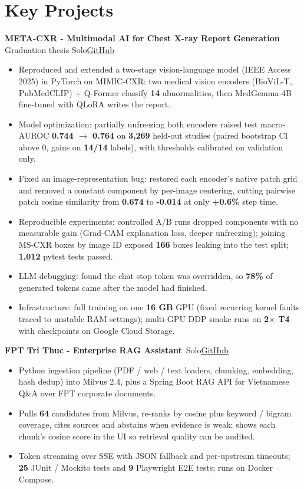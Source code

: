 \documentclass[10pt, a4paper]{article}
\newcommand{\project}[3]{\textbf{#1}\,{\color{MutedText}\textbar{} #2}\hfill\href{#3}{GitHub}\par}
\begin{document}
\section{Key Projects}
\project{META-CXR - Multimodal AI for Chest X-ray Report Generation}{Graduation thesis \textbullet{} Solo}{https://github.com/minhphuong150505/Meta-CXR}
\begin{itemize}
  \item Reproduced and extended a two-stage vision-language model (IEEE Access 2025) in PyTorch on MIMIC-CXR: two medical vision encoders (BioViL-T, PubMedCLIP) + Q-Former classify \textbf{14} abnormalities, then MedGemma-4B fine-tuned with QLoRA writes the report.
  \item Model optimization: partially unfreezing both encoders raised test macro-AUROC \textbf{0.744 $\rightarrow$ 0.764} on \textbf{3,269} held-out studies (paired bootstrap CI above 0, gains on \textbf{14/14} labels), with thresholds calibrated on validation only.
  \item Fixed an image-representation bug: restored each encoder's native patch grid and removed a constant component by per-image centering, cutting pairwise patch cosine similarity from \textbf{0.674} to \textbf{-0.014} at only \textbf{+0.6\%} step time.
  \item Reproducible experiments: controlled A/B runs dropped components with no measurable gain (Grad-CAM explanation loss, deeper unfreezing); joining MS-CXR boxes by image ID exposed \textbf{166} boxes leaking into the test split; \textbf{1,012} pytest tests passed.
  \item LLM debugging: found the chat stop token was overridden, so \textbf{78\%} of generated tokens came after the model had finished.
  \item Infrastructure: full training on one \textbf{16 GB} GPU (fixed recurring kernel faults traced to unstable RAM settings); multi-GPU DDP smoke runs on \textbf{2$\times$ T4} with checkpoints on Google Cloud Storage.
\end{itemize}
\vspace{2pt}
\project{FPT Tri Thuc - Enterprise RAG Assistant}{Solo}{https://github.com/minhphuong150505/milvus-rag-demo}
\begin{itemize}
  \item Python ingestion pipeline (PDF / web / text loaders, chunking, embedding, hash dedup) into Milvus 2.4, plus a Spring Boot RAG API for Vietnamese Q\&A over FPT corporate documents.
  \item Pulls \textbf{64} candidates from Milvus, re-ranks by cosine plus keyword / bigram coverage, cites sources and abstains when evidence is weak; shows each chunk's cosine score in the UI so retrieval quality can be audited.
  \item Token streaming over SSE with JSON fallback and per-upstream timeouts; \textbf{25} JUnit / Mockito tests and \textbf{9} Playwright E2E tests; runs on Docker Compose.
\end{itemize}
\end{document}
